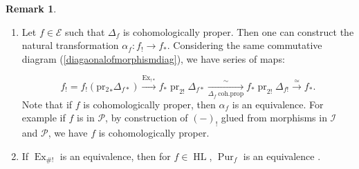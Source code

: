 \documentclass[14pt]{article}
\theoremstyle{definition}
\newtheorem{remark}[theorem]{Remark}
\newcommand{\E}{\mathcal{E}}
\renewcommand{\P}{\mathcal{P}}
\newcommand{\op}[1]{\operatorname{#1}}
\newcommand{\I}{\mathscr{I}}
\numberwithin{subsection}{section}
\begin{document}
\begin{remark}
\begin{enumerate}
    \item Let $f \in \E$ such that $\Delta_f$ is cohomologically proper. Then one can construct the natural transformation $\alpha_f : f_! \to f_*$. Considering the same commutative diagram (\cref{diagaonalofmorphismdiag}), we have series of maps:

\begin{equation}
    f_! = f_!(\op{pr_2}_*\Delta_{f*}) \xrightarrow{\op{Ex}_{!*}} f_*\op{pr}_{2!}\Delta_{f*} \xrightarrow[\Delta_f~\text{coh.prop}]{\op{\sim}}f_*\op{pr}_{2!}\Delta_{f!} \xrightarrow{\op{\simeq}} f_*.
\end{equation}
Note that if $f$ is cohomologically proper, then $\alpha_f$ is an equivalence. For example if $f$ is in $\P$, by construction of $(-)_!$  glued from morphisms in $\I$ and $\P$, we have $f$ is cohomologically proper. 
\item If $\op{Ex}_{\#!}$ is an equivalence, then for $f \in \op{HL}$, $\op{Pur}_f$ is an equivalence . 

\end{enumerate}
\end{remark}
\end{document}
